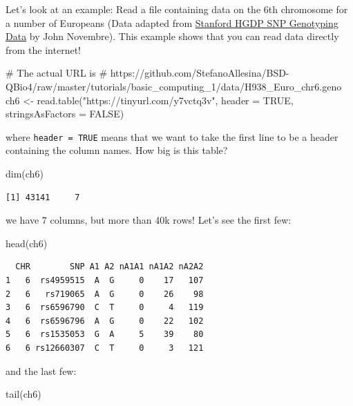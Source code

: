 \documentclass[
  letterpaper,
  DIV=11,
  numbers=noendperiod]{scrreprt}
\newenvironment{Shaded}{\begin{snugshade}}{\end{snugshade}}
\newcommand{\AttributeTok}[1]{\textcolor[rgb]{0.40,0.45,0.13}{#1}}
\newcommand{\CommentTok}[1]{\textcolor[rgb]{0.37,0.37,0.37}{#1}}
\newcommand{\ConstantTok}[1]{\textcolor[rgb]{0.56,0.35,0.01}{#1}}
\newcommand{\FunctionTok}[1]{\textcolor[rgb]{0.28,0.35,0.67}{#1}}
\newcommand{\NormalTok}[1]{\textcolor[rgb]{0.00,0.23,0.31}{#1}}
\newcommand{\OtherTok}[1]{\textcolor[rgb]{0.00,0.23,0.31}{#1}}
\newcommand{\StringTok}[1]{\textcolor[rgb]{0.13,0.47,0.30}{#1}}
\begin{document}
Let's look at an example: Read a file containing data on the 6th
chromosome for a number of Europeans (Data adapted from
\href{hagsc.org/hgdp/}{Stanford HGDP SNP Genotyping Data} by John
Novembre). This example shows that you can read data directly from the
internet!

\begin{Shaded}
\begin{Highlighting}[]
\CommentTok{\# The actual URL is}
\CommentTok{\# https://github.com/StefanoAllesina/BSD{-}QBio4/raw/master/tutorials/basic\_computing\_1/data/H938\_Euro\_chr6.geno}
\NormalTok{ch6 }\OtherTok{\textless{}{-}} \FunctionTok{read.table}\NormalTok{(}\StringTok{"https://tinyurl.com/y7vctq3v"}\NormalTok{, }
                  \AttributeTok{header =} \ConstantTok{TRUE}\NormalTok{, }\AttributeTok{stringsAsFactors =} \ConstantTok{FALSE}\NormalTok{)}
\end{Highlighting}
\end{Shaded}

where \texttt{header\ =\ TRUE} means that we want to take the first line
to be a header containing the column names. How big is this table?

\begin{Shaded}
\begin{Highlighting}[]
\FunctionTok{dim}\NormalTok{(ch6)}
\end{Highlighting}
\end{Shaded}

\begin{verbatim}
[1] 43141     7
\end{verbatim}

we have 7 columns, but more than 40k rows! Let's see the first few:

\begin{Shaded}
\begin{Highlighting}[]
\FunctionTok{head}\NormalTok{(ch6)}
\end{Highlighting}
\end{Shaded}

\begin{verbatim}
  CHR        SNP A1 A2 nA1A1 nA1A2 nA2A2
1   6  rs4959515  A  G     0    17   107
2   6   rs719065  A  G     0    26    98
3   6  rs6596790  C  T     0     4   119
4   6  rs6596796  A  G     0    22   102
5   6  rs1535053  G  A     5    39    80
6   6 rs12660307  C  T     0     3   121
\end{verbatim}

and the last few:

\begin{Shaded}
\begin{Highlighting}[]
\FunctionTok{tail}\NormalTok{(ch6)}
\end{Highlighting}
\end{Shaded}
\end{document}

